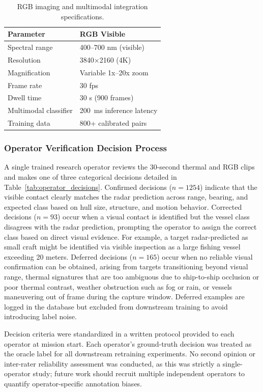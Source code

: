 \documentclass[conf]{asmeconf}
\begin{document}
\begin{table}[t]
\caption{RGB imaging and multimodal integration specifications.}
\label{tab:camera_rgb}
\centering
\small
\begin{tabular}{@{}ll@{}}
\toprule
Parameter & RGB Visible \\
\midrule
Spectral range & 400--700 nm (visible) \\
Resolution & 3840$\times$2160 (4K) \\
Magnification & Variable 1x--20x zoom \\
Frame rate & 30 fps \\
Dwell time & 30 s (900 frames) \\
\midrule
Multimodal classifier & \SI{200}{ms} inference latency \\
Training data & 800+ calibrated pairs \\
\bottomrule
\end{tabular}
\end{table}

\subsubsection{Operator Verification Decision Process}

A single trained research operator reviews the 30-second thermal and RGB clips and makes one of three categorical decisions detailed in Table~\ref{tab:operator_decisions}. Confirmed decisions ($n=1254$) indicate that the visible contact clearly matches the radar prediction across range, bearing, and expected class based on hull size, structure, and motion behavior. Corrected decisions ($n=93$) occur when a visual contact is identified but the vessel class disagrees with the radar prediction, prompting the operator to assign the correct class based on direct visual evidence. For example, a target radar-predicted as small craft might be identified via visible inspection as a large fishing vessel exceeding 20 meters. Deferred decisions ($n=165$) occur when no reliable visual confirmation can be obtained, arising from targets transitioning beyond visual range, thermal signatures that are too ambiguous due to ship-to-ship occlusion or poor thermal contrast, weather obstruction such as fog or rain, or vessels maneuvering out of frame during the capture window. Deferred examples are logged in the database but excluded from downstream training to avoid introducing label noise.

Decision criteria were standardized in a written protocol provided to each operator at mission start. Each operator's ground-truth decision was treated as the oracle label for all downstream retraining experiments. No second opinion or inter-rater reliability assessment was conducted, as this was strictly a single-operator study; future work should recruit multiple independent operators to quantify operator-specific annotation biases.
\end{document}
